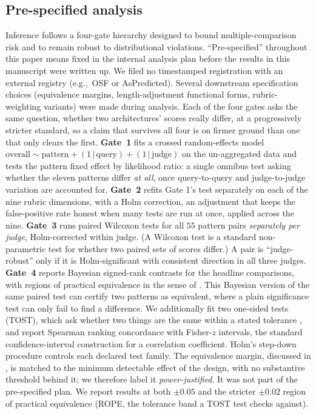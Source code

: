 \documentclass[11pt]{article}
\newcommand{\eg}{e.g.,\ }
\begin{document}
\subsection{Pre-specified analysis}
Inference follows a four-gate hierarchy designed to bound multiple-comparison risk and
to remain robust to distributional violations. ``Pre-specified'' throughout this paper means
fixed in the internal analysis plan before the results in this manuscript were written up. We
filed no timestamped registration with an external registry (\eg OSF or AsPredicted). Several
downstream specification choices (equivalence margins, length-adjustment functional forms,
rubric-weighting variants) were made during analysis.
Each of the four gates asks the same question, whether two architectures'
scores really differ, at a progressively stricter standard, so a claim that survives all four
is on firmer ground than one that only clears the first.
\textbf{Gate~1} fits a crossed random-effects model
$\text{overall} \sim \text{pattern} + (1\,|\,\text{query}) + (1\,|\,\text{judge})$ on
the un-aggregated data and tests the pattern fixed effect by likelihood ratio: a single
omnibus test asking whether the eleven patterns differ \emph{at all}, once query-to-query and
judge-to-judge variation are accounted for.
\textbf{Gate~2} refits Gate 1's test separately on each of the nine rubric dimensions, with a
Holm correction, an adjustment that keeps the false-positive rate honest when many tests are
run at once, applied across the nine.
\textbf{Gate~3} runs paired Wilcoxon tests for all $55$ pattern pairs \emph{separately per
judge}, Holm-corrected within judge. (A Wilcoxon test is a standard non-parametric test for
whether two paired sets of scores differ.) A pair is ``judge-robust'' only if it is
Holm-significant with consistent direction in all three judges.
\textbf{Gate~4} reports Bayesian signed-rank contrasts for the headline comparisons, with
regions of practical equivalence in the sense of \citet{kruschke2018rope}. This Bayesian
version of the same paired test can certify two patterns as equivalent, where a plain
significance test can only fail to find a difference.
We additionally fit two one-sided tests (TOST), which ask whether two things are the same
within a stated tolerance \citep{schuirmann1987tost,lakens2017tost}, and report Spearman
ranking concordance with Fisher-$z$ intervals, the standard confidence-interval construction
for a correlation coefficient. Holm's step-down procedure
\citep{holm1979} controls each declared test family. The equivalence margin, discussed in
, is matched to the minimum detectable
effect of the design, with no substantive threshold behind it; we therefore label it
\emph{power-justified}. It was not part of the pre-specified plan. We report results at
both $\pm0.05$ and the stricter $\pm0.02$ region of practical equivalence (ROPE, the tolerance
band a TOST test checks against).
\end{document}
